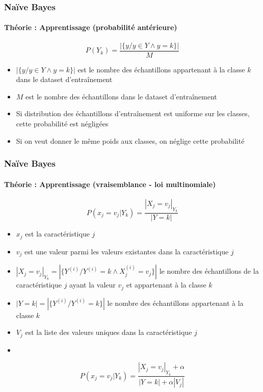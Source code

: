 \documentclass[xcolor=table]{beamer}
\begin{document}
\begin{frame}
	\frametitle{Naïve Bayes}
	\framesubtitle{Théorie : Apprentissage (probabilité antérieure)}
	
	\[P(Y_k) = \frac{|\{y / y \in Y \wedge y = k\}|}{M}\]
	
	\begin{itemize}
		\item $|\{y / y \in Y \wedge y = k\}|$ est le nombre des échantillons appartenant à la classe $k$ dans le dataset d'entraînement
		\item $M$ est le nombre des échantillons dans le dataset d'entraînement
		\item Si distribution des échantillons d'entraînement est uniforme sur les classes, cette probabilité est négligées 
		\item Si on veut donner le même poids aux classes, on néglige cette probabilité
	\end{itemize}
	
	
\end{frame}


\begin{frame}
	\frametitle{Naïve Bayes}
	\framesubtitle{Théorie : Apprentissage (vraisemblance - loi multinomiale)}
	
	\[P(x_j = v_j|Y_k) = \frac{|X_j = v_j|_{Y_k}}{|Y = k|}\]
	
	\begin{itemize}
		\item $x_j$ est la caractéristique $j$
		\item $v_j$ est une valeur parmi les valeurs existantes dans la caractéristique $j$
		\item $|X_j = v_j|_{Y_k} = |\{Y^{(i)} / Y^{(i)} = k \wedge X^{(i)}_j = v_j\}|$ le nombre des échantillons de la caractéristique $j$ ayant la valeur $v_j$ et appartenant à la classe $k$
		\item $|Y = k| = |\{Y^{(i)} / Y^{(i)} = k \}|$ le nombre des échantillons appartenant à la classe $k$
		\item $V_j$ est la liste des valeurs uniques dans la caractéristique $j$
		\item {}
	\end{itemize}

	\[P(x_j = v_j|Y_k) = \frac{|X_j = v_j|_{Y_k} + \alpha}{|Y = k| + \alpha |V_j|}\]
	
	
\end{frame}
\end{document}
